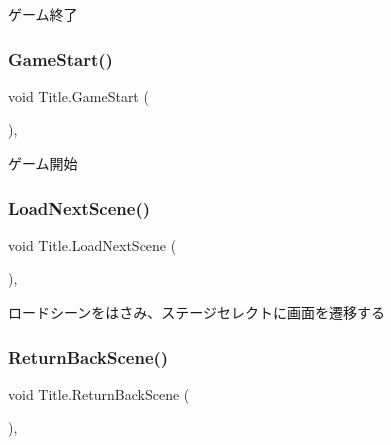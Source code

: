 ゲーム終了 

\mbox{\label{class_title_aad4ba589818e3ad8b1794ff6a2785efa}} 
\subsubsection{\texorpdfstring{Game\+Start()}{GameStart()}}
{\footnotesize\ttfamily void Title.\+Game\+Start (\begin{DoxyParamCaption}{ }\end{DoxyParamCaption})\hspace{0.3cm}{\ttfamily [inline]}, {\ttfamily [private]}}



ゲーム開始 

\mbox{\label{class_title_a78ccd194042c8a8a5bc9ea22d30f0b62}} 
\subsubsection{\texorpdfstring{Load\+Next\+Scene()}{LoadNextScene()}}
{\footnotesize\ttfamily void Title.\+Load\+Next\+Scene (\begin{DoxyParamCaption}{ }\end{DoxyParamCaption})\hspace{0.3cm}{\ttfamily [inline]}, {\ttfamily [private]}}



ロードシーンをはさみ、ステージセレクトに画面を遷移する 

\mbox{\label{class_title_acee6703092dc812e12d65a9b003670ec}} 
\subsubsection{\texorpdfstring{Return\+Back\+Scene()}{ReturnBackScene()}}
{\footnotesize\ttfamily void Title.\+Return\+Back\+Scene (\begin{DoxyParamCaption}{ }\end{DoxyParamCaption})\hspace{0.3cm}{\ttfamily [inline]}, {\ttfamily [private]}}



